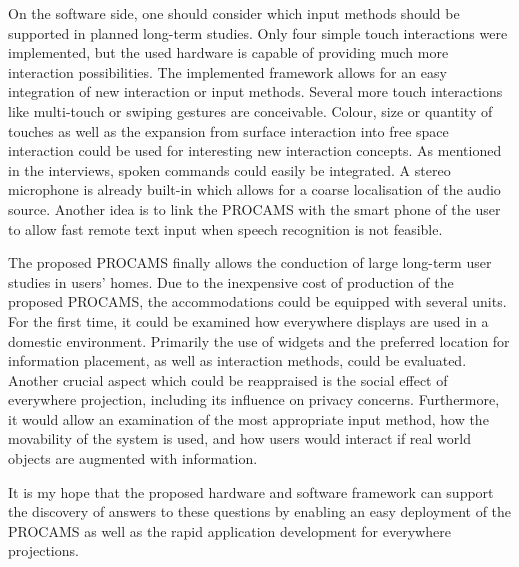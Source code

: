 On the software side, one should consider which input methods should be supported in planned long-term studies. Only four simple touch interactions were implemented, but the used hardware is capable of providing much more interaction possibilities. The implemented framework allows for an easy integration of new interaction or input methods. Several more touch interactions like multi-touch or swiping gestures are conceivable. Colour, size or quantity of touches as well as the expansion from surface interaction into free space interaction could be used for interesting new interaction concepts. As mentioned in the interviews, spoken commands could easily be integrated. A stereo microphone is already built-in which allows for a coarse localisation of the audio source. Another idea is to link the PROCAMS with the smart phone of the user to allow fast remote text input when speech recognition is not feasible.

The proposed PROCAMS finally allows the conduction of large long-term user studies in users' homes. Due to the inexpensive cost of production of the proposed PROCAMS, the accommodations could be equipped with several units. For the first time, it could be examined how everywhere displays are used in a domestic environment. Primarily the use of widgets and the preferred location for information placement, as well as interaction methods, could be evaluated. Another crucial aspect which could be reappraised is the social effect of everywhere projection, including its influence on privacy concerns. Furthermore, it would allow an examination of  the most appropriate input method, how the movability of the system is used, and how users would interact if real world objects are augmented with information. 

It is my hope that the proposed hardware and software framework can support the discovery of answers to these questions by enabling an easy deployment of the PROCAMS as well as the rapid application development for everywhere projections. 